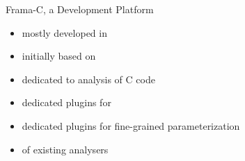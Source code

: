 \begin{frame}{Frama-C, a Development Platform}

  \begin{itemize}
  \item mostly developed in  
    \smallskip
  \item initially based on  {\small \gray{[Necula et al, CC'02]}}
    \smallskip
  \item {\large {}} dedicated to analysis of C code
  \end{itemize}

  \begin{center}
    \large{}
  \end{center}
  \vspace{-1mm}

  \begin{itemize}
    \smallskip
  \item dedicated plugins for  {\small {}}
    \smallskip
  \item dedicated plugins for fine-grained parameterization
    \smallskip
  \item {} of existing analysers
  \end{itemize}

\end{frame}

